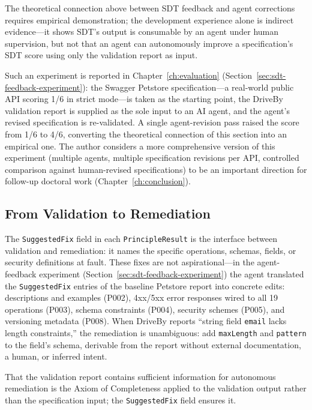 The theoretical connection above between SDT feedback and agent corrections requires empirical demonstration; the development experience alone is indirect evidence---it shows SDT's output is consumable by an agent under human supervision, but not that an agent can autonomously improve a specification's SDT score using only the validation report as input.

Such an experiment is reported in Chapter~\ref{ch:evaluation} (Section~\ref{sec:sdt-feedback-experiment}): the Swagger Petstore specification---a real-world public API scoring 1/6 in strict mode---is taken as the starting point, the DriveBy validation report is supplied as the sole input to an AI agent, and the agent's revised specification is re-validated. A single agent-revision pass raised the score from 1/6 to 4/6, converting the theoretical connection of this section into an empirical one. The author considers a more comprehensive version of this experiment (multiple agents, multiple specification revisions per API, controlled comparison against human-revised specifications) to be an important direction for follow-up doctoral work (Chapter~\ref{ch:conclusion}).

\subsection{From Validation to Remediation}
\label{subsec:validation-remediation}

The \texttt{SuggestedFix} field in each \texttt{PrincipleResult} is the interface between validation and remediation: it names the specific operations, schemas, fields, or security definitions at fault. These fixes are not aspirational---in the agent-feedback experiment (Section~\ref{sec:sdt-feedback-experiment}) the agent translated the \texttt{SuggestedFix} entries of the baseline Petstore report into concrete edits: descriptions and examples (P002), 4xx/5xx error responses wired to all 19 operations (P003), schema constraints (P004), security schemes (P005), and versioning metadata (P008). When DriveBy reports ``string field \texttt{email} lacks length constraints,'' the remediation is unambiguous: add \texttt{maxLength} and \texttt{pattern} to the field's schema, derivable from the report without external documentation, a human, or inferred intent.

That the validation report contains sufficient information for autonomous remediation is the Axiom of Completeness applied to the validation output rather than the specification input; the \texttt{SuggestedFix} field ensures it.

